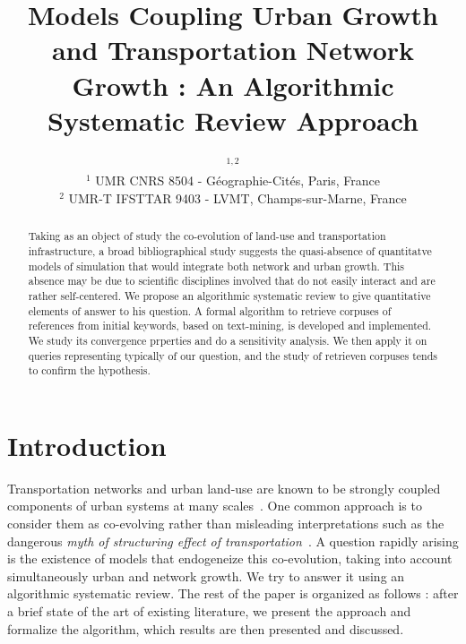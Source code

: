 




\title{Models Coupling Urban Growth and Transportation Network Growth : An Algorithmic Systematic Review Approach}
\author{$^{1,2}$\\
$^{1}$ UMR CNRS 8504 - G{\'e}ographie-Cit{\'e}s, Paris, France\\
$^{2}$ UMR-T IFSTTAR 9403 - LVMT, Champs-sur-Marne, France
}
\date{}

\maketitle

\begin{abstract}
Taking as an object of study the co-evolution of land-use and transportation infrastructure, a broad bibliographical study suggests the quasi-absence of quantitatve models of simulation that would integrate both network and urban growth. This absence may be due to scientific disciplines involved that do not easily interact and are rather self-centered. We propose an algorithmic systematic review to give quantitative elements of answer to his question. A formal algorithm to retrieve corpuses of references from initial keywords, based on text-mining, is developed and implemented. We study its convergence prperties and do a sensitivity analysis. We then apply it on queries representing typically of our question, and the study of retrieven corpuses tends to confirm the hypothesis.
\end{abstract}



\section{Introduction}

Transportation networks and urban land-use are known to be strongly coupled components of urban systems at many scales~\cite{bretagnolle:tel-00459720}. One common approach is to consider them as co-evolving rather than misleading interpretations such as the dangerous \emph{myth of structuring effect of transportation}~\cite{offner1993effets}. A question rapidly arising is the existence of models that endogeneize this co-evolution, taking into account simultaneously urban and network growth. We try to answer it using an algorithmic systematic review. The rest of the paper is organized as follows : after a brief state of the art of existing literature, we present the approach and formalize the algorithm, which results are then presented and discussed.


